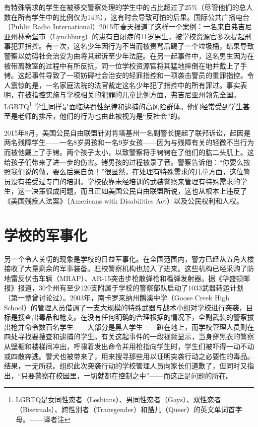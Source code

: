 \documentclass[fontset=fandol, a4paper, 12pt, openright]{ctexbook}
\begin{document}
有特殊需求的学生在被移交警察处理的学生中的占比超过了25\%（尽管他们的总人数在所有学生中的比例仅为14\%），这有时会导致可怕的后果。国际公共广播电台（Public Radio International）2015年春天报道了这样一个案例：一名来自弗吉尼亚州林奇堡市（Lynchburg）的患有自闭症的11岁男生，被学校资源官多次提起刑事犯罪指控。有一次，这名少年因行为不当而被责骂后踢了一个垃圾桶，结果导致警察以妨碍社会治安为由将其起诉至少年法庭。在另一起事件中，这名男生因为在被带离教室的过程中有所反抗，同一位学校资源官将其猛地摔倒在地并戴上了手铐。这起事件导致了一项妨碍社会治安的轻罪指控和一项袭击警员的重罪指控。令人震惊的是，一名家庭法院的法官裁定这名少年犯了指控中的所有罪过。事实表明，在被指控实施与学校相关的犯罪的儿童比例方面，弗吉尼亚州领先全国。LGBTQ\footnote{LGBTQ是女同性恋者（Lesbians）、男同性恋者（Gays）、双性恋者（Bisexuals）、跨性别者（Transgender）和酷儿（Queer）的英文单词首字母。——译者注} 学生同样是面临惩罚性纪律和逮捕的高风险群体。他们经常受到学生甚至是老师的排斥，他们的行为也由此被视为是“反社会”的。

2015年8月，美国公民自由联盟针对肯塔基州一名副警长提起了联邦诉讼，起因是两名残障学生——一名8岁男孩和一名9岁女孩——因为与残障有关的轻微不当行为而被他戴上了手铐。两个孩子太小，以致警察将手铐铐在了他们的肱二头肌上。这给孩子们带来了进一步的伤害。铐男孩的过程被录了音。警察告诉他：“你要么按照我们说的做，要么后果自负！”很显然，在处理有特殊需求的儿童方面，这位警员没有接受过专门的培训。学校依靠未经培训的武装警察来管理有特殊需求的学生，这一决策很成问题，而且正如美国公民自由联盟所说，这也从根本上违反了《美国残疾人法案》（Americans with Disabilities Act）以及公民权利和人权。

\section{学校的军事化}

另一个令人关切的现象是学校的日益军事化。在全国范围内，警方已经从五角大楼接收了大量剩余的军事装备。驻校警察机构也加入了进来。这些机构已经采购了防地雷反伏击车辆（MRAP）、AR-15突击步枪散弹枪和榴弹发射器。据《华盛顿邮报》报道，30个州有至少120支附属于学校的警察部队启动了1033武器转运计划（第一章曾讨论过）。2003年，南卡罗来纳州鹅溪中学（Goose Creek High School）的管理人员借调了一支大规模的特殊武器与战术小组对学校进行突袭，目标是搜查出毒品和枪支。在没有任何明确的合理根据的情况下，全副武装的警察拔出枪并命令数百名学生——大部分是黑人学生——趴在地上，而学校管理人员则在四处寻找要搜查和逮捕的学生。有关这起事件的一段视频显示，当身穿黑衣的警察从壁橱和楼梯间冲出，呼啸着发出命令并用枪指向学生时，学生们被吓得一动不动或四散奔逃。警犬也被带来了，用来搜寻那些用以证明突袭行动之必要性的毒品。结果，一无所获。组织此次突袭行动的学校管理人员向家长们道歉了，但同时又指出，“只要警察在校园里，一切就都在控制之中”——而这正是问题的所在。
\end{document}
